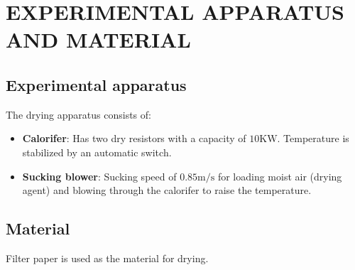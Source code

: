 \section{EXPERIMENTAL APPARATUS AND MATERIAL}
\subsection{Experimental apparatus}
The drying apparatus consists of:
\begin{itemize}
    \item \textbf{Calorifer}: Has two dry resistors with a capacity of $10\text{KW}$. Temperature is stabilized by an automatic switch.
    \item \textbf{Sucking blower}: Sucking speed of $0.85\text{m/s}$ for loading moist air (drying agent) and blowing through the calorifer to raise the temperature.
\end{itemize}

\subsection{Material}
Filter paper is used as the material for drying.
